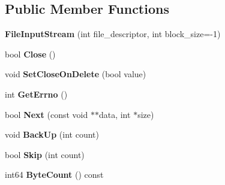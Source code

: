 \subsection*{Public Member Functions}
\begin{DoxyCompactItemize}
\item 
\mbox{\label{classgoogle_1_1protobuf_1_1io_1_1FileInputStream_a2ec1d33846fdaf936418118457a4e5c5}} 
{\bfseries File\+Input\+Stream} (int file\+\_\+descriptor, int block\+\_\+size=-\/1)
\item 
\mbox{\label{classgoogle_1_1protobuf_1_1io_1_1FileInputStream_af8ff42bef9c6487e2b71d01c52b3c6ab}} 
bool {\bfseries Close} ()
\item 
\mbox{\label{classgoogle_1_1protobuf_1_1io_1_1FileInputStream_ab76023123c3018f4c598f01f265cb560}} 
void {\bfseries Set\+Close\+On\+Delete} (bool value)
\item 
\mbox{\label{classgoogle_1_1protobuf_1_1io_1_1FileInputStream_a3d6dfaef5604017815a86c3d317b6a06}} 
int {\bfseries Get\+Errno} ()
\item 
\mbox{\label{classgoogle_1_1protobuf_1_1io_1_1FileInputStream_a023e1048df8a0056b5e0b2f4656a2412}} 
bool {\bfseries Next} (const void $\ast$$\ast$data, int $\ast$size)
\item 
\mbox{\label{classgoogle_1_1protobuf_1_1io_1_1FileInputStream_a6deefe242dc5112a1b1057172811d5f1}} 
void {\bfseries Back\+Up} (int count)
\item 
\mbox{\label{classgoogle_1_1protobuf_1_1io_1_1FileInputStream_a5ada9ba6a538c764113a416a507db317}} 
bool {\bfseries Skip} (int count)
\item 
\mbox{\label{classgoogle_1_1protobuf_1_1io_1_1FileInputStream_a629bc2e151ffd71b4c8e29ecffc1147e}} 
int64 {\bfseries Byte\+Count} () const
\item 
$$
\end{DoxyCompactItemize}
